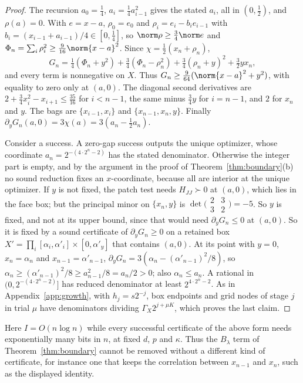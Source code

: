 \begin{proof}
The recursion $a_0=\frac14$, $a_i=\frac14a_{i-1}^2$ gives the stated $a_i$,
all in $(0,\frac12)$, and $\rho(a)=0$. With $e=x-a$, $\rho_0=e_0$ and
$\rho_i=e_i-b_ie_{i-1}$ with $b_i=(x_{i-1}+a_{i-1})/4\in[0,\frac14]$, so
$\norm\rho\ge\frac34\norm e$ and $\Phi_n=\sum_i\rho_i^2\ge\frac9{16}\norm{x-a}^2$.
Since $\chi=\frac12(x_n+\rho_n)$,
\[
G_n=\tfrac14(\Phi_n+y^2)+\tfrac34(\Phi_n-\rho_n^2)+\tfrac34(\rho_n+y)^2+\tfrac32yx_n ,
\]
and every term is nonnegative on $X$. Thus
$G_n\ge\frac9{64}(\norm{x-a}^2+y^2)$, with equality to zero only at $(a,0)$.
The diagonal second derivatives are $2+\frac34x_i^2-x_{i+1}\le\frac{35}{16}$
for $i<n-1$, the same minus $\frac34y$ for $i=n-1$, and $2$ for $x_n$ and
$y$. The bags are $\{x_{i-1},x_i\}$ and $\{x_{n-1},x_n,y\}$. Finally
$\partial_yG_n(a,0)=3\chi(a)=3(a_n-\frac12a_n)$.

Consider a success. A zero-gap success outputs the unique optimizer, whose
coordinate $a_n=2^{-(4\cdot2^n-2)}$ has the stated denominator. Otherwise
the integer part is empty, and by the argument in the proof of
Theorem~\ref{thm:boundary}(b) no sound reduction fixes an $x$-coordinate,
because all are interior at the unique optimizer. If $y$ is not fixed, the
patch test needs $H_{JJ}\succ0$ at $(a,0)$, which lies in the face box; but
the principal minor on $\{x_n,y\}$ is
$\det\bigl(\begin{smallmatrix}2&3\\3&2\end{smallmatrix}\bigr)=-5$. So $y$ is
fixed, and not at its upper bound, since that would need
$\partial_yG_n\le0$ at $(a,0)$. So it is fixed by a sound certificate of
$\partial_yG_n\ge0$ on a retained box
$X'=\prod_i[\alpha_i,\alpha'_i]\times[0,\alpha'_y]$ that contains $(a,0)$. At
its point with $y=0$, $x_n=\alpha_n$ and $x_{n-1}=\alpha'_{n-1}$,
$\partial_yG_n=3(\alpha_n-(\alpha'_{n-1})^2/8)$, so
$\alpha_n\ge(\alpha'_{n-1})^2/8\ge a_{n-1}^2/8=a_n/2>0$; also $\alpha_n\le a_n$.
A rational in $(0,2^{-(4\cdot2^n-2)}]$ has reduced denominator at least
$2^{4\cdot2^n-2}$. As in Appendix~\ref{app:growth}, with $h_j=s2^{-j}$, box
endpoints and grid nodes of stage $j$ in trial $\mu$ have denominators
dividing $\Gamma_X2^{j+\mu K}$, which proves the last claim.
\end{proof}

Here $I=O(n\log n)$ while every successful certificate of the above form
needs exponentially many bits in $n$, at fixed $d$, $p$ and $\kappa$. Thus
the $B_\lambda$ term of Theorem~\ref{thm:boundary} cannot be removed without
a different kind of certificate, for instance one that keeps the correlation
between $x_{n-1}$ and $x_n$, such as the displayed identity.

